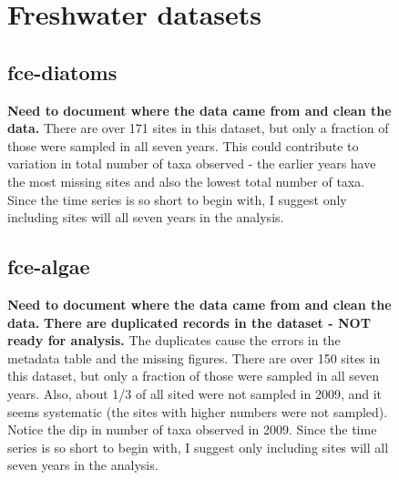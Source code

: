 \documentclass[11pt, oneside]{article}
\begin{document}
\begin{figure}[h!]
\section {Freshwater datasets}

\subsection {fce-diatoms}
{\bf Need to document where the data came from and clean the data.}
There are over 171 sites in this dataset, but only a fraction of those were sampled in all seven years.
This could  contribute to variation in total number of taxa observed - the earlier years have the most missing sites and also the lowest total number of taxa.
Since the time series is so short to begin with, I suggest only including sites will all seven years in the analysis.

\subsection {fce-algae}
{\bf Need to document where the data came from and clean the data.}
{\bf There are duplicated records in the dataset - NOT ready for analysis.}
The duplicates cause the errors in the metadata table and the missing figures.
There are over 150 sites in this dataset, but only a fraction of those were sampled in all seven years.
Also, about 1/3 of all sited were not sampled in 2009, and it seems systematic (the sites with higher numbers were not sampled).
Notice the dip in number of taxa observed in 2009.
Since the time series is so short to begin with, I suggest only including sites will all seven years in the analysis.



\end{figure}
\end{document}
